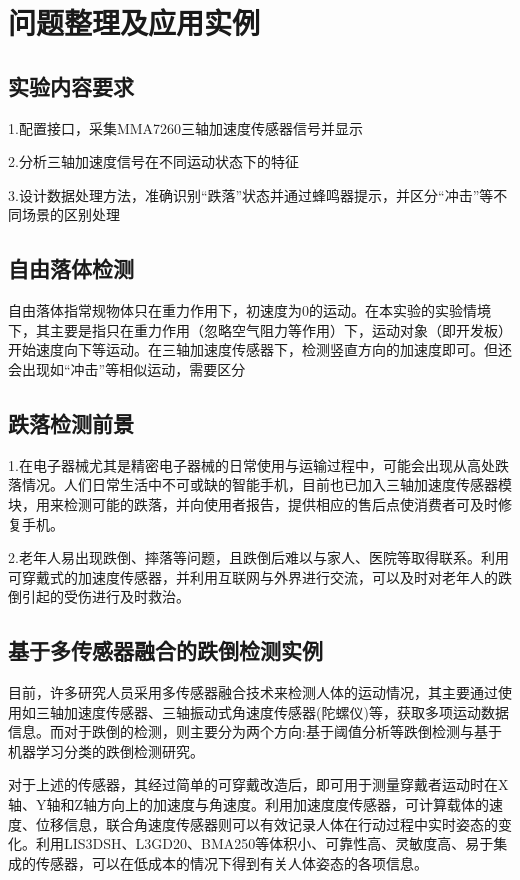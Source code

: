 \section{问题整理及应用实例}

\subsection{实验内容要求}
\par{1.配置接口，采集MMA7260三轴加速度传感器信号并显示}
\par{2.分析三轴加速度信号在不同运动状态下的特征}
\par{3.设计数据处理方法，准确识别“跌落”状态并通过蜂鸣器提示，并区分“冲击”等不同场景的区别处理
}

\subsection{自由落体检测}
\par{自由落体指常规物体只在重力作用下，初速度为0的运动。在本实验的实验情境下，其主要是指只在重力作用（忽略空气阻力等作用）下，运动对象（即开发板）开始速度向下等运动。在三轴加速度传感器下，检测竖直方向的加速度即可。但还会出现如“冲击”等相似运动，需要区分}

\subsection{跌落检测前景}
\par{1.在电子器械尤其是精密电子器械的日常使用与运输过程中，可能会出现从高处跌落情况。人们日常生活中不可或缺的智能手机，目前也已加入三轴加速度传感器模块，用来检测可能的跌落，并向使用者报告，提供相应的售后点使消费者可及时修复手机。}
\par{2.老年人易出现跌倒、摔落等问题，且跌倒后难以与家人、医院等取得联系。利用可穿戴式的加速度传感器，并利用互联网与外界进行交流，可以及时对老年人的跌倒引起的受伤进行及时救治。}

\subsection{基于多传感器融合的跌倒检测实例}
\par{目前，许多研究人员采用多传感器融合技术来检测人体的运动情况，其主要通过使用如三轴加速度传感器、三轴振动式角速度传感器(陀螺仪)等，获取多项运动数据信息。而对于跌倒的检测，则主要分为两个方向:基于阈值分析等跌倒检测与基于机器学习分类的跌倒检测研究。}

\par{对于上述的传感器，其经过简单的可穿戴改造后，即可用于测量穿戴者运动时在X轴、Y轴和Z轴方向上的加速度与角速度。利用加速度度传感器，可计算载体的速度、位移信息，联合角速度传感器则可以有效记录人体在行动过程中实时姿态的变化。利用LIS3DSH、L3GD20、BMA250等体积小、可靠性高、灵敏度高、易于集成的传感器，可以在低成本的情况下得到有关人体姿态的各项信息。}

